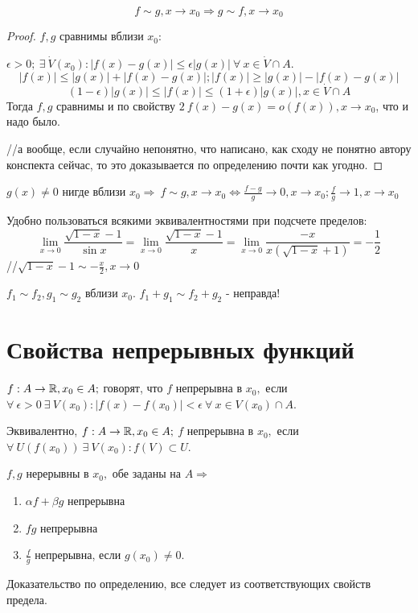 \documentclass[12pt]{report}
\begin{document}
\begin{lm}
$$f \sim g, x \to x_0 \Rightarrow g \sim f, x \to x_0$$
\end{lm}
\begin{proof}
$f, g$ сравнимы вблизи $x_0$:

$\epsilon > 0; ~\exists ~\dot V(x_0): |f(x) - g(x)| \le \epsilon |g(x)| ~\forall ~x \in \dot V \cap A$.
$$|f(x)| \le |g(x)| + |f(x) - g(x)|; |f(x)| \ge |g(x)| - |f(x) - g(x)|$$
$$(1 - \epsilon)|g(x)| \le |f(x)| \le (1 + \epsilon)|g(x)|, x \in \dot V \cap A$$
Тогда $f, g$ сравнимы и по свойству $2 ~f(x) - g(x) = o(f(x)), x \to x_0$, что и надо было.

//а вообще, если случайно непонятно, что написано, как сходу не понятно автору конспекта сейчас, то это доказывается по определению почти как угодно.
\end{proof}

\begin{st}
$g(x) \neq 0$ нигде вблизи $x_0 \Rightarrow ~ f \sim g, x \to x_0 \Leftrightarrow \frac{f - g}{g} \to 0, x \to x_0; \frac{f}{g} \to 1, x \to x_0$
\end{st}

\begin{ex}
Удобно пользоваться всякими эквивалентностями при подсчете пределов:
$$\lim_{x \to 0}{\frac{\sqrt{1 - x} - 1}{\sin{x}}} = \lim_{x \to 0}{\frac{\sqrt{1 - x} - 1}{x}} = \lim_{x \to 0}{\frac{-x}{x(\sqrt{1 - x} + 1)}} = -\frac{1}{2}$$
//$\sqrt{1 - x} - 1 \sim -\frac{x}{2}, x \to 0$
\end{ex}

\begin{rem}
$f_1 \sim f_2, g_1 \sim g_2$ вблизи $x_0$. $f_1 + g_1 \sim f_2 + g_2$ - неправда!
\end{rem}

\chapter{Свойства непрерывных функций}
\begin{defn}
$f: A \to \mathbb{R}, x_0 \in A;$ говорят, что $f$ непрерывна в $x_0,$ если $\forall ~\epsilon > 0 ~\exists ~V(x_0): |f(x) - f(x_0)| < \epsilon ~\forall ~x \in V(x_0) \cap A $.

Эквивалентно, $f: A \to \mathbb{R}, x_0 \in A;$ $f$ непрерывна в $x_0,$ если $\forall ~U(f(x_0)) ~\exists ~V(x_0): f(V) \subset U$.
\end{defn}

\begin{prop}
$f, g$ нерерывны в $x_0,$ обе заданы на $A \Rightarrow$
\begin{enumerate}
\item $\alpha f + \beta g$ непрерывна
\item $fg$ непрерывна
\item $\frac{f}{g}$ непрерывна, если $g(x_0) \neq 0$.
\end{enumerate}

Доказательство по определению, все следует из соответствующих свойств предела.
\end{prop}
\end{document}
